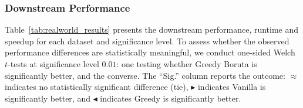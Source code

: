 \documentclass[runningheads]{llncs}
\begin{document}
\subsubsection{Downstream Performance}
\label{sec:experiments:realworld:performance}
 
Table~\ref{tab:realworld_results} presents the downstream performance, runtime and speedup for each dataset and significance level. To assess whether the observed performance differences are statistically meaningful, we conduct one-sided Welch $t$-tests at significance level $0.01$: one testing whether Greedy Boruta is significantly better, and the converse. The ``Sig.'' column reports the outcome: $\approx$ indicates no statistically significant difference (tie), $\blacktriangleright$ indicates Vanilla is significantly better, and $\blacktriangleleft$ indicates Greedy is significantly better.
\end{document}
